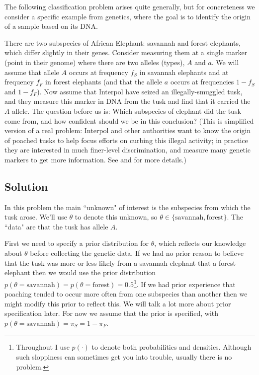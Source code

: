 \documentclass[times,11pt]{article}
\def\s{\mbox{savannah}}
\def\f{\mbox{forest}}
\def\ffA{f_F}
\def\fsA{f_S}
\def\pif{\pi_F}
\def\pis{\pi_S}
\begin{document}
The following classification problem arises quite generally, but for concreteness we consider a 
specific example from genetics, where
the goal is to identify the origin of a sample based on its DNA.


There are two subspecies of African Elephant: savannah and forest elephants, which differ slightly in their genes. Consider measuring them at a single marker (point in their genome) where there are two alleles (types), $A$ and $a$. We will assume that allele $A$ occurs at frequency $\fsA$ in savannah elephants 
and at frequency $\ffA$ in forest elephants (and that the allele $a$ occurs at frequencies $1-\fsA$ and $1-\ffA$). Now assume that Interpol have seized an illegally-smuggled tusk, and they measure this marker in DNA from the tusk and find that it carried the $A$ allele. The question before us is: Which subspecies of elephant did the tusk come from, and how confident should we be in this conclusion? (This is simplified version of a real problem: Interpol and other authorities want to know the origin of poached tusks to help focus efforts on curbing this illegal activity; in practice they are interested in much finer-level discrimination, and measure many genetic markers to get more information. See
\cite{wasser.etal.07} and \cite{wasser.etal.08}
for more details.)


\subsection*{Solution}

In this problem the main ``unknown" of interest is the subspecies from which the tusk arose. We'll use $\theta$ to denote this unknown, so $\theta \in \{\s,\f\}$. The ``data" are that the tusk has allele $A$.

First we need to specify a prior distribution for $\theta$, which reflects our knowledge about $\theta$ before collecting the genetic data. If we had no prior reason to believe that the tusk was more or less likely from a savannah elephant that a forest elephant then we would use the prior distribution $p(\theta=\s) = p(\theta=\f) = 0.5$\footnote{Throughout I use $p(\cdot)$ to denote both probabilities and densities. Although such sloppiness can sometimes get you into trouble, usually there is no problem.}. If we had prior experience that poaching tended to occur more often from one subspecies than another then we might modify this prior to reflect this. We will talk a lot more about prior specification later. For now we assume that the prior is specified, with $p(\theta=\s)= \pis = 1-\pif$.
\end{document}
